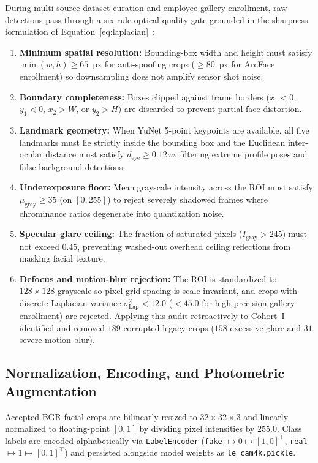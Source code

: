 During multi-source dataset curation and employee gallery enrollment, raw detections pass through a six-rule optical quality gate grounded in the sharpness formulation of Equation~\eqref{eq:laplacian}~\cite{pech2000diatom}:
\begin{enumerate}
    \item \textbf{Minimum spatial resolution:} Bounding-box width and height must satisfy $\min(w, h) \ge 65$~px for anti-spoofing crops ($\ge 80$~px for ArcFace enrollment) so downsampling does not amplify sensor shot noise.
    \item \textbf{Boundary completeness:} Boxes clipped against frame borders ($x_1 < 0$, $y_1 < 0$, $x_2 > W$, or $y_2 > H$) are discarded to prevent partial-face distortion.
    \item \textbf{Landmark geometry:} When YuNet 5-point keypoints are available, all five landmarks must lie strictly inside the bounding box and the Euclidean inter-ocular distance must satisfy $d_{\text{eye}} \ge 0.12\,w$, filtering extreme profile poses and false background detections.
    \item \textbf{Underexposure floor:} Mean grayscale intensity across the ROI must satisfy $\mu_{\text{gray}} \ge 35$ (on $[0, 255]$) to reject severely shadowed frames where chrominance ratios degenerate into quantization noise.
    \item \textbf{Specular glare ceiling:} The fraction of saturated pixels ($I_{\text{gray}} > 245$) must not exceed $0.45$, preventing washed-out overhead ceiling reflections from masking facial texture.
    \item \textbf{Defocus and motion-blur rejection:} The ROI is standardized to $128\times128$ grayscale so pixel-grid spacing is scale-invariant, and crops with discrete Laplacian variance $\sigma^2_{\text{Lap}} < 12.0$ ($< 45.0$ for high-precision gallery enrollment) are rejected. Applying this audit retroactively to Cohort~I identified and removed $189$ corrupted legacy crops ($158$ excessive glare and $31$ severe motion blur).
\end{enumerate}

\subsection{Normalization, Encoding, and Photometric Augmentation}

Accepted BGR facial crops are bilinearly resized to $32\times32\times3$ and linearly normalized to floating-point $[0, 1]$ by dividing pixel intensities by $255.0$. Class labels are encoded alphabetically via \texttt{LabelEncoder} (\texttt{fake} $\mapsto 0 \mapsto [1, 0]^\top$, \texttt{real} $\mapsto 1 \mapsto [0, 1]^\top$) and persisted alongside model weights as \texttt{le\_cam4k.pickle}.


